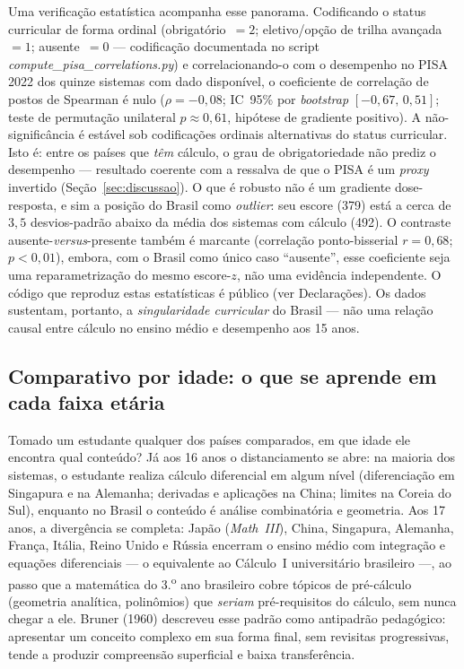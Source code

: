 \documentclass[12pt,a4paper,oneside]{article}
\begin{document}
Uma verificação estatística acompanha esse panorama. Codificando o status
curricular de forma ordinal (obrigatório~$=2$; eletivo/opção de trilha
avançada~$=1$; ausente~$=0$ --- codificação documentada no script
\emph{compute\_pisa\_correlations.py}) e correlacionando-o com o desempenho
no PISA 2022 dos quinze sistemas com dado disponível, o coeficiente de correlação
de postos de Spearman é nulo ($\rho = -0{,}08$; IC~95\% por \emph{bootstrap}
$[-0{,}67,\, 0{,}51]$; teste de permutação unilateral $p \approx 0{,}61$,
hipótese de gradiente positivo). A não-significância é estável sob
codificações ordinais alternativas do status curricular. Isto é: entre os
países que \emph{têm} cálculo, o grau de obrigatoriedade não prediz o desempenho ---
resultado coerente com a ressalva de que o PISA é um \emph{proxy} invertido
(Seção~\ref{sec:discussao}). O que é robusto não é um gradiente
dose-resposta, e sim a posição do Brasil como \emph{outlier}: seu escore
(379) está a cerca de $3{,}5$ desvios-padrão abaixo da média dos sistemas
com cálculo (492). O contraste ausente-\emph{versus}-presente também é
marcante (correlação ponto-bisserial $r = 0{,}68$; $p < 0{,}01$), embora,
com o Brasil como único caso ``ausente'', esse coeficiente seja uma
reparametrização do mesmo escore-$z$, não uma evidência independente. O
código que reproduz estas estatísticas é público (ver Declarações). Os
dados sustentam, portanto, a \emph{singularidade curricular} do Brasil ---
não uma relação causal entre cálculo no ensino médio e desempenho aos 15 anos.

\subsection{Comparativo por idade: o que se aprende em cada faixa etária}

Tomado um estudante qualquer dos países comparados, em que idade ele
encontra qual conteúdo? Já aos 16 anos o distanciamento se abre: na maioria
dos sistemas, o estudante realiza cálculo diferencial em algum nível
(diferenciação em Singapura e na Alemanha; derivadas e aplicações na China;
limites na Coreia do Sul), enquanto no Brasil o conteúdo é análise
combinatória e geometria. Aos 17 anos, a divergência se completa: Japão
(\emph{Math~III}), China, Singapura, Alemanha, França, Itália, Reino Unido
e Rússia encerram o ensino médio com integração e equações diferenciais
--- o equivalente ao Cálculo~I universitário brasileiro ---, ao passo que a
matemática do 3.\textsuperscript{o} ano brasileiro cobre tópicos de
pré-cálculo (geometria analítica, polinômios) que \emph{seriam}
pré-requisitos do cálculo, sem nunca chegar a ele. Bruner (1960) descreveu
esse padrão como antipadrão pedagógico: apresentar um conceito complexo em
sua forma final, sem revisitas progressivas, tende a produzir compreensão
superficial e baixa transferência.
\end{document}
